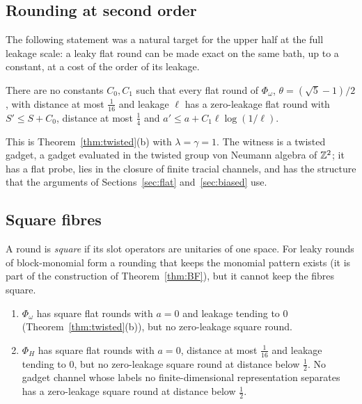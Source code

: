 \subsection{Rounding at second order}

The following statement was a natural target for the upper half at the full leakage scale: a leaky flat round can be made exact on the same bath,
up to a constant, at a cost of the order of its leakage.

\begin{corollary}\label{cor:second-order}
There are no constants $C_0,C_1$ such that every flat round of $\Phi_\omega$, $\theta=(\sqrt5-1)/2$, with distance at most $\frac1{16}$ and leakage
$\ell$ has a zero-leakage flat round with $S'\le S+C_0$, distance at most $\frac14$ and $a'\le a+C_1\ell\log(1/\ell)$.
\end{corollary}

This is Theorem~\ref{thm:twisted}(b) with $\lambda=\gamma=1$. The witness is a twisted gadget, a gadget evaluated in the twisted group von Neumann
algebra of $\mathbb Z^2$; it has a flat probe, lies in the closure of finite tracial channels, and has the structure that the arguments of
Sections~\ref{sec:flat} and~\ref{sec:biased} use.

\subsection{Square fibres}

A round is \emph{square} if its slot operators are unitaries of one space. For leaky rounds of block-monomial form a rounding that keeps the monomial
pattern exists (it is part of the construction of Theorem~\ref{thm:BF}), but it cannot keep the fibres square.

\begin{proposition}\label{prop:square}\leavevmode
\begin{enumerate}[label=(\alph*),itemsep=1pt]
\item $\Phi_\omega$ has square flat rounds with $a=0$ and leakage tending to $0$ (Theorem~\ref{thm:twisted}(b)), but no zero-leakage square round.
\item $\Phi_H$ has square flat rounds with $a=0$, distance at most $\frac1{16}$ and leakage tending to $0$, but no zero-leakage square round at distance below
$\frac12$. No gadget channel whose labels no finite-dimensional representation separates has a zero-leakage square round at distance below $\frac12$.
\end{enumerate}
\end{proposition}

